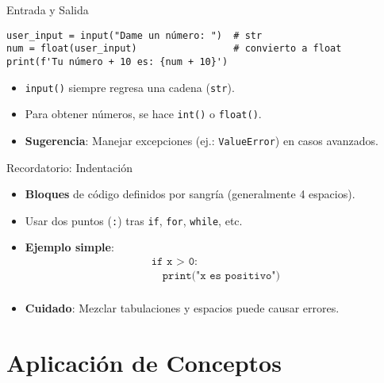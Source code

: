 \documentclass[10pt]{beamer}
\begin{document}
\begin{frame}[fragile]{Entrada y Salida}
\begin{verbatim}
user_input = input("Dame un número: ")  # str
num = float(user_input)                 # convierto a float
print(f'Tu número + 10 es: {num + 10}')
\end{verbatim}
\begin{itemize}
  \item \texttt{input()} siempre regresa una cadena (\texttt{str}).
  \item Para obtener números, se hace \texttt{int()} o \texttt{float()}.
  \item \textbf{Sugerencia}: Manejar excepciones (ej.: \texttt{ValueError}) en casos avanzados.
\end{itemize}
\end{frame}

\begin{frame}{Recordatorio: Indentación}
  \begin{itemize}
    \item \textbf{Bloques} de código definidos por sangría (generalmente 4 espacios).
    \item Usar dos puntos (\texttt{:}) tras \texttt{if}, \texttt{for}, \texttt{while}, etc.
    \item \textbf{Ejemplo simple}:
    \[
      \begin{array}{l}
      \texttt{if x > 0:} \\
      \quad \texttt{print("x es positivo")} \\
      \end{array}
    \]
    \item \textbf{Cuidado}: Mezclar tabulaciones y espacios puede causar errores.
  \end{itemize}
\end{frame}

\section{Aplicación de Conceptos}
\end{document}
